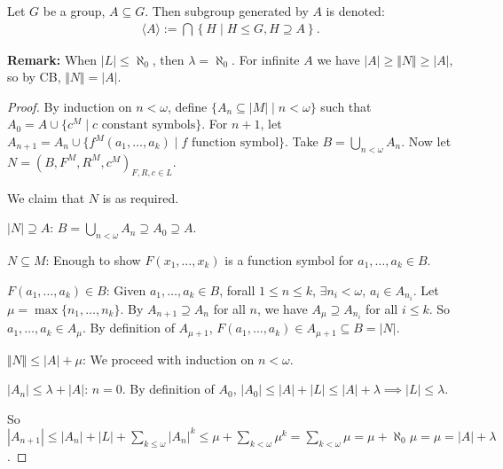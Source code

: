 \documentclass{report}
\begin{document}
\newpage
\noindent Let $G$ be a group, $A \subseteq G$. Then subgroup generated by $A$ is denoted:
\begin{align*}
    \langle A \rangle := \bigcap \left\{ H \mid H \leq G, H \supseteq A \right\}.
\end{align*}

\noindent \textbf{Remark:} When $|L| \leq \aleph_0$, then $\lambda = \aleph_0$. For infinite $A$ we have $|A| \geq \Vert N \Vert \geq |A|$, so by CB, $\Vert N \Vert = |A|$.
\begin{proof}
    By induction on $n < \omega$, define $\{A_n \subseteq |M| \mid n < \omega \}$ such that $A_0 = A \cup \{c^M \mid c \text{ constant symbols}\}$. For $n+1$, let $A_{n+1} = A_n \cup \{f^M(a_1, \ldots, a_k) \mid f \text{ function symbol}\}$. Take $B = \bigcup_{n < \omega} A_n$. Now let $N = (B, F^M, R^M, c^M)_{F, R, c \in L}$.

    We claim that $N$ is as required. 
    
    $|N| \supseteq A$: $B = \bigcup_{n < \omega} A_n \supseteq A_0 \supseteq A$.

    $N \subseteq M$: Enough to show $F(x_1, \ldots, x_k)$ is a function symbol for $a_1, \ldots, a_k \in B$. 

    $F(a_1, \ldots, a_k) \in B$: Given $a_1, \ldots, a_k \in B$, forall $1 \leq n \leq k$, $\exists n_i < \omega$, $a_i \in A_{n_i}$. Let $\mu = \max \{n_1, \ldots, n_k\}$. By $A_{n+1} \supseteq A_n$ for all $n$, we have $A_\mu \supseteq A_{n_i}$ for all $i \leq k$. So $a_1, \ldots, a_k \in A_\mu$. By definition of $A_{\mu + 1}$, $F(a_1, \ldots, a_k) \in A_{\mu + 1} \subseteq B = |N|$. 

    $\Vert N \Vert \leq |A| + \mu$: We proceed with induction on $n < \omega$.

    $|A_n| \leq \lambda + |A|$: $n=0$. By definition of $A_0$, $|A_0| \leq |A| + |L| \leq |A| + \lambda \implies |L| \leq \lambda$.

    So $|A_{n+1}| \leq |A_n| + |L| + \sum_{k \leq \omega} |A_n|^k \leq \mu + \sum_{k < \omega} \mu^k = \sum_{k < \omega} \mu = \mu + \aleph_0 \mu = \mu = |A|  + \lambda$.
\end{proof}
\end{document}
